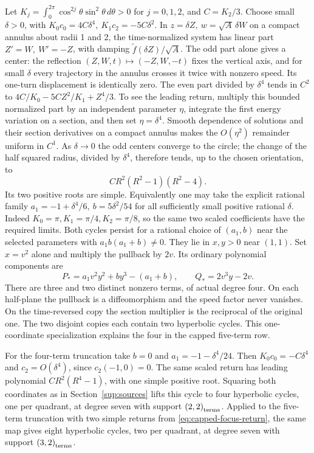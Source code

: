 Let \(K_j=\int_0^{2\pi}\cos^{2j}\theta\sin^2\theta\,d\theta>0\) for \(j=0,1,2\), and \(C=K_2/3\). Choose small \(\delta>0\), with \(K_0c_0=4C\delta^4,\ K_1c_2=-5C\delta^2\). In \(z=\delta Z,\ w=\sqrt A\,\delta W\) on a compact annulus about radii 1 and 2, the time-normalized system has linear part \(Z'=W,\ W'=-Z\), with damping \(\widetilde f(\delta Z)/\sqrt A\). The odd part alone gives a center: the reflection \((Z,W,t)\mapsto(-Z,W,-t)\) fixes the vertical axis, and for small \(\delta\) every trajectory in the annulus crosses it twice with nonzero speed. Its one-turn displacement is identically zero. The even part divided by \(\delta^4\) tends in \(C^2\) to \(4C/K_0-5CZ^2/K_1+Z^4/3\). To see the leading return, multiply this bounded normalized part by an independent parameter \(\eta\), integrate the first energy variation on a section, and then set \(\eta=\delta^4\). Smooth dependence of solutions and their section derivatives on a compact annulus makes the \(O(\eta^2)\) remainder uniform in \(C^1\). As \(\delta\to0\) the odd centers converge to the circle; the change of the half squared radius, divided by \(\delta^4\), therefore tends, up to the chosen orientation, to
\begin{equation}\label{eq:capped-focus-return}
 C R^2(R^2-1)(R^2-4).
\end{equation}
Its two positive roots are simple. Equivalently one may take the explicit rational family \(a_1=-1+\delta^4/6,\ b=5\delta^2/54\) for all sufficiently small positive rational \(\delta\). Indeed \(K_0=\pi, K_1=\pi/4, K_2=\pi/8\), so the same two scaled coefficients have the required limits. Both cycles persist for a rational choice of \((a_1,b)\) near the selected parameters with \(a_1b(a_1+b)\ne0\). They lie in \(x,y>0\) near \((1,1)\). Set \(x=v^2\) alone and multiply the pullback by \(2v\). Its ordinary polynomial components are
\[
 P_*=a_1v^2 y^2+b y^3-(a_1+b),\qquad Q_*=2v^3y-2v.
\]
There are three and two distinct nonzero terms, of actual degree four. On each half-plane the pullback is a diffeomorphism and the speed factor never vanishes. On the time-reversed copy the section multiplier is the reciprocal of the original one. The two disjoint copies each contain two hyperbolic cycles. This one-coordinate specialization explains the four in the capped five-term row.

For the four-term truncation take \(b=0\) and \(a_1=-1-\delta^4/24\). Then \(K_0c_0=-C\delta^4\) and \(c_2=O(\delta^4)\), since \(c_2(-1,0)=0\). The same scaled return has leading polynomial \(CR^2(R^4-1)\), with one simple positive root. Squaring both coordinates as in Section~\ref{sup:sources} lifts this cycle to four hyperbolic cycles, one per quadrant, at degree seven with support \(\left(2,2\right)_{\mathrm{terms}}\). Applied to the five-term truncation with two simple returns from \eqref{eq:capped-focus-return}, the same map gives eight hyperbolic cycles, two per quadrant, at degree seven with support \(\left(3,2\right)_{\mathrm{terms}}\).

